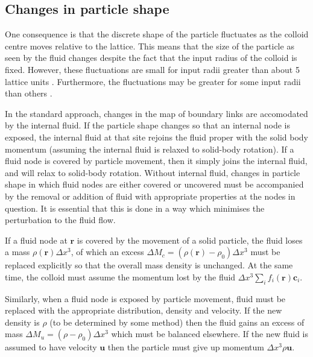 \subsection{Changes in particle shape}

One consequence is that the discrete shape of the particle fluctuates
as the colloid centre moves relative to the
lattice. This means that the size of the particle as seen by the
fluid changes despite the fact that the input radius of the colloid
is fixed.  However, these fluctuations are small for input radii
greater than about 5 lattice units \cite{l96a}. Furthermore, the
fluctuations may be greater for some input radii than others
\cite{nl02}.


In the standard approach, changes in the map of boundary links
are accomodated by the internal fluid. If the particle shape
changes so that an internal node is exposed, the internal fluid
at that site rejoins the fluid proper with the solid body momentum
(assuming the internal fluid is relaxed to solid-body rotation).
If a fluid node is covered by particle movement, then it simply
joins the internal fluid, and will relax to solid-body rotation.
Without internal fluid, changes in particle shape
in which fluid nodes are either covered or uncovered must be
accompanied by the removal or addition
of fluid with appropriate properties at the nodes in question.
It is essential that this
is done in a way which minimises the perturbation to the fluid
flow.


If a fluid node at $\mathbf{r}$ is covered by the movement of a
solid particle,
the fluid loses a mass $\rho(\mathbf{r}) \Delta x^3$, of which an excess
$\Delta M_c = (\rho(\mathbf{r}) - \rho_0)\Delta x^3$ must be replaced
explicitly so that
the overall mass density is unchanged. At the same time, the
colloid must assume the momentum lost by the fluid
$\Delta x^3 \sum_i f_i(\mathbf{r}) \mathbf{c}_i$.

Similarly, when a fluid node is exposed by particle movement,
fluid must be replaced with the appropriate distribution, density
and velocity. If the
new density is $\rho$ (to be determined by some method) then
the fluid gains an excess of mass $\Delta M_u = (\rho - \rho_0)
\Delta x^3$ which must be balanced elsewhere. If the new fluid
is assumed to have velocity $\mathbf{u}$ then the particle must
give up momentum $\Delta x^3 \rho\mathbf{u}$.

